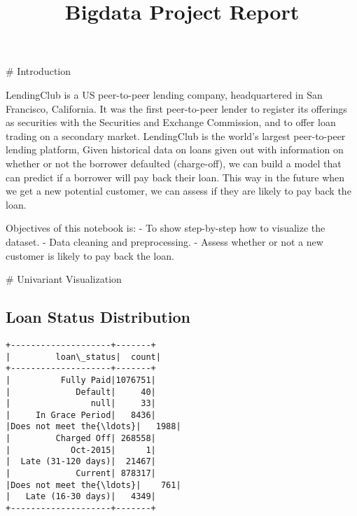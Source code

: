 \documentclass[11pt]{article}
\title{{\Huge Bigdata Project Report}}
\author{}
\begin{document}
    
    \maketitle
    
    

    
    \# Introduction

    LendingClub is a US peer-to-peer lending company, headquartered in San
Francisco, California. It was the first peer-to-peer lender to register
its offerings as securities with the Securities and Exchange Commission,
and to offer loan trading on a secondary market. LendingClub is the
world's largest peer-to-peer lending platform, Given historical data on
loans given out with information on whether or not the borrower
defaulted (charge-off), we can build a model that can predict if a
borrower will pay back their loan. This way in the future when we get a
new potential customer, we can assess if they are likely to pay back the
loan.

Objectives of this notebook is: - To show step-by-step how to visualize
the dataset. - Data cleaning and preprocessing. - Assess whether or not
a new customer is likely to pay back the loan.

    \# Univariant Visualization

    \hypertarget{loan-status-distribution}{%
\subsection{Loan Status Distribution}\label{loan-status-distribution}}

    \begin{Verbatim}[commandchars=\\\{\}]
+--------------------+-------+
|         loan\_status|  count|
+--------------------+-------+
|          Fully Paid|1076751|
|             Default|     40|
|                null|     33|
|     In Grace Period|   8436|
|Does not meet the{\ldots}|   1988|
|         Charged Off| 268558|
|            Oct-2015|      1|
|  Late (31-120 days)|  21467|
|             Current| 878317|
|Does not meet the{\ldots}|    761|
|   Late (16-30 days)|   4349|
+--------------------+-------+

    \end{Verbatim}

    \begin{center}
    \end{center}
    { \hspace*{\fill} \\}
    
\end{document}
